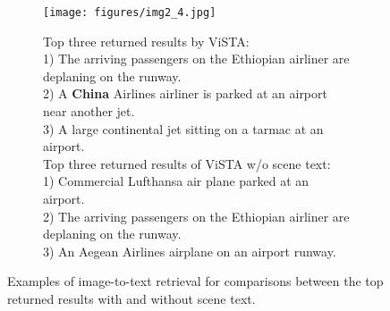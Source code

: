 \documentclass[10pt,twocolumn,letterpaper]{article}
\begin{document}
\begin{figure*}
\begin{subfigure}{.32\textwidth}
    \label{sf2}
  \end{subfigure}
  \hspace{3pt}
   \begin{subfigure}{.35\textwidth}
    \centering
    \texttt{[image: figures/img2\_4.jpg]}
    \caption{Top three returned results by ViSTA:\\
     \tiny
    1) The arriving passengers on the Ethiopian airliner are deplaning on the runway. \textcolor{blue}{\XSolidBrush} \\
    2) A \textbf{China} Airlines airliner is parked at an airport near another jet. \textcolor{red}{\CheckmarkBold}\\
    3) A large continental jet sitting on a tarmac at an airport. \textcolor{blue}{\XSolidBrush} \vspace{5pt} \\ 
    \scriptsize
    Top three returned results of ViSTA w/o scene text:\\
    \tiny
    1) Commercial Lufthansa air plane parked at an airport. \textcolor{blue}{\XSolidBrush} \\
    2) The arriving passengers on the Ethiopian airliner are deplaning on the runway. \textcolor{blue}{\XSolidBrush}\\
    3) An Aegean Airlines airplane on an airport runway. \textcolor{blue}{\XSolidBrush}
    }
    \label{sf1}
  \end{subfigure}\vspace{-0.5em}
  \caption{Examples of image-to-text retrieval for comparisons between the top returned results with and without scene text.}\vspace{-0.5em}
  \label{fig:image2text-demo}
\end{figure*}
\end{document}

